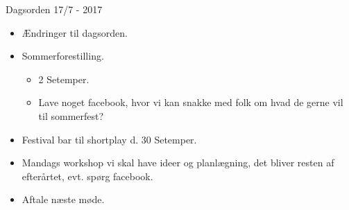 \documentclass[12pt, a4paper]{article}
\begin{document}
\begin{center}
  {\LARGE Dagsorden 17/7 - 2017}
\end{center}

\begin{itemize}
  \item Ændringer til dagsorden.
  \item Sommerforestilling.
  \begin{itemize}
    \item 2 Setemper.
    \item Lave noget facebook, hvor vi kan snakke med folk om hvad de gerne vil til sommerfest?
  \end{itemize}
  \item Festival bar til shortplay d. 30 Setemper.
  \item Mandags workshop vi skal have ideer og planlægning, det bliver resten af efterårtet, evt. spørg facebook.
  \item Aftale næste møde.
\end{itemize}
\end{document}
